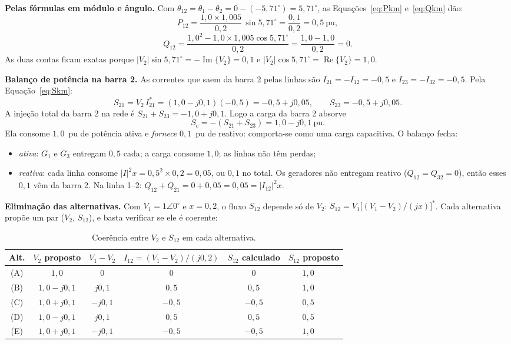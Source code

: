 \documentclass[a4paper,11pt]{article}
\numberwithin{equation}{section}
\numberwithin{figure}{section}
\numberwithin{table}{section}
\newcommand{\passo}[1]{{\color{blue_theme}\bfseries #1}\enspace}
\newcommand{\ok}{\textcolor{blue_theme}{\ding{51}}}
\newcommand{\nok}{\textcolor{red}{\ding{55}}}
\begin{document}
\passo{Pelas fórmulas em módulo e ângulo.} Com $\theta_{12} = \theta_1 -
\theta_2 = 0 - (-5{,}71^\circ) = 5{,}71^\circ$, as
Equações~\eqref{eq:Pkm} e~\eqref{eq:Qkm} dão:
\[
  P_{12} = \frac{1{,}0 \times 1{,}005}{0{,}2}\,\sin 5{,}71^\circ
         = \frac{0{,}1}{0{,}2} = 0{,}5~\text{pu},
\]
\[
  Q_{12} = \frac{1{,}0^{2} - 1{,}0 \times 1{,}005\cos 5{,}71^\circ}{0{,}2}
         = \frac{1{,}0 - 1{,}0}{0{,}2} = 0 .
\]
As duas contas ficam exatas porque $|V_2|\sin 5{,}71^\circ =
-\operatorname{Im}\{V_2\} = 0{,}1$ e $|V_2|\cos 5{,}71^\circ =
\operatorname{Re}\{V_2\} = 1{,}0$.

\passo{Balanço de potência na barra 2.} As correntes que saem da barra 2
pelas linhas são $I_{21} = -I_{12} = -0{,}5$ e $I_{23} = -I_{32} = -0{,}5$.
Pela Equação~\eqref{eq:Skm}:
\[
  S_{21} = V_2\,I_{21}^{*} = (1{,}0 - j0{,}1)(-0{,}5) = -0{,}5 + j0{,}05,
  \qquad
  S_{23} = -0{,}5 + j0{,}05 .
\]
A injeção total da barra 2 na rede é $S_{21} + S_{23} = -1{,}0 + j0{,}1$.
Logo a carga da barra 2 absorve
\[
  S_c = -(S_{21} + S_{23}) = 1{,}0 - j0{,}1~\text{pu}.
\]
Ela consome $1{,}0$~pu de potência ativa e \emph{fornece} $0{,}1$~pu de
reativo: comporta-se como uma carga capacitiva. O balanço fecha:
\begin{itemize}
  \item \emph{ativa}: $G_1$ e $G_3$ entregam $0{,}5$ cada; a carga consome
        $1{,}0$; as linhas não têm perdas;
  \item \emph{reativa}: cada linha consome $|I|^{2}x = 0{,}5^{2} \times
        0{,}2 = 0{,}05$, ou $0{,}1$ no total. Os geradores não entregam
        reativo ($Q_{12} = Q_{32} = 0$), então esses $0{,}1$ vêm da barra 2.
        Na linha 1--2: $Q_{12} + Q_{21} = 0 + 0{,}05 = 0{,}05 = |I_{12}|^{2}x$.
\end{itemize}

\passo{Eliminação das alternativas.} Com $V_1 = 1\angle 0^\circ$ e $x =
0{,}2$, o fluxo $S_{12}$ depende só de $V_2$:
$S_{12} = V_1\bigl[(V_1 - V_2)/(jx)\bigr]^{*}$. Cada alternativa propõe um
par ($V_2$, $S_{12}$), e basta verificar se ele é coerente:

\begin{table}[H]
  \centering
  \begin{tabular}{@{}cccccc@{}}
    \toprule
    Alt. & $V_2$ proposto & $V_1 - V_2$ & $I_{12} = (V_1 - V_2)/(j0{,}2)$ &
    $S_{12}$ calculado & $S_{12}$ proposto \\
    \midrule
    (A) & $1{,}0$          & $0$         & $0$        & $0$        & $1{,}0$ \ \ \nok \\
    (B) & $1{,}0 - j0{,}1$ & $j0{,}1$    & $0{,}5$    & $0{,}5$    & $1{,}0$ \ \ \nok \\
    (C) & $1{,}0 + j0{,}1$ & $-j0{,}1$   & $-0{,}5$   & $-0{,}5$   & $0{,}5$ \ \ \nok \\
    (D) & $1{,}0 - j0{,}1$ & $j0{,}1$    & $0{,}5$    & $0{,}5$    & $0{,}5$ \ \ \ok \\
    (E) & $1{,}0 + j0{,}1$ & $-j0{,}1$   & $-0{,}5$   & $-0{,}5$   & $1{,}0$ \ \ \nok \\
    \bottomrule
  \end{tabular}
  \caption{Coerência entre $V_2$ e $S_{12}$ em cada alternativa.}
  \label{tab:alternativas}
\end{table}
\end{document}
